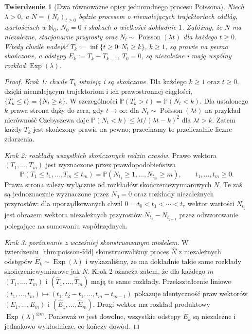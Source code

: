 \documentclass[11pt,a4paper,oneside]{report}
\numberwithin{equation}{chapter}
\theoremstyle{plain}
\newtheorem{twierdzenie}{Twierdzenie}[chapter]
\theoremstyle{definition}
\theoremstyle{remark}
\newcommand{\N}{\mathbb{N}}
\newcommand{\Prob}{\mathbb{P}}
\begin{document}
\begin{twierdzenie}[Dwa równoważne opisy jednorodnego procesu Poissona]
\label{thm:poisson-reverse}
Niech $\lambda>0$, a $N=(N_t)_{t\ge0}$ będzie procesem
o niemalejących trajektoriach c\`adl\`ag, wartościach
w $\N_0$, $N_0=0$ i skokach o wielkości dokładnie $1$.
Załóżmy, że $N$ ma niezależne, stacjonarne przyrosty
oraz $N_t\sim\operatorname{Poisson}(\lambda t)$ dla każdego
$t\ge0$. Wtedy chwile nadejść
$T_k:=\inf\{t\ge0:N_t\ge k\}$, $k\ge1$,
są prawie na pewno skończone, a odstępy
$E_k:=T_k-T_{k-1}$, $T_0=0$, są niezależne i mają
wspólny rozkład $\operatorname{Exp}(\lambda)$.
\end{twierdzenie}
\begin{proof}
\emph{Krok 1: chwile $T_k$ istnieją i są skończone.}
Dla każdego $k\ge1$ oraz $t\ge0$, dzięki niemalejącym
trajektoriom i ich prawostronnej ciągłości,
$\{T_k\le t\}=\{N_t\ge k\}$.
W szczególności $\Prob(T_k>t)=\Prob(N_t<k)$.
Dla ustalonego $k$ prawa strona dąży do zera, gdy
$t\to\infty$: dla $N_t\sim\operatorname{Poisson}(\lambda t)$
na przykład nierówność Czebyszewa daje
$\Prob(N_t<k)\le\lambda t/(\lambda t-k)^2$
dla $\lambda t>k$.
Zatem każdy $T_k$ jest skończony prawie na pewno;
przecinamy te przeliczalnie liczne zdarzenia.

\emph{Krok 2: rozkłady wszystkich skończonych rodzin czasów.}
Prawo wektora $(T_1,\ldots,T_m)$ jest wyznaczone
przez prawdopodobieństwa
\[
\Prob(T_1\le t_1,\ldots,T_m\le t_m)
=\Prob(N_{t_1}\ge1,\ldots,N_{t_m}\ge m),
\qquad t_1,\ldots,t_m\ge0.
\]
Prawa strona zależy wyłącznie od rozkładów
skończeniewymiarowych $N$. Te zaś są jednoznacznie
wyznaczone przez $N_0=0$ oraz rozkłady niezależnych
przyrostów: dla uporządkowanych chwil $0=t_0<t_1<\cdots<t_r$
wektor wartości $N_{t_j}$ jest obrazem wektora
niezależnych przyrostów $N_{t_j}-N_{t_{j-1}}$ przez
odwzorowanie polegające na sumowaniu współrzędnych.

\emph{Krok 3: porównanie z wcześniej skonstruowanym modelem.}
W twierdzeniu~\ref{thm:poisson-fdd} skonstruowaliśmy
proces $\widehat N$ z niezależnych odstępów
$\widehat E_k\sim\operatorname{Exp}(\lambda)$ i wykazaliśmy,
że ma dokładnie takie same rozkłady skończeniewymiarowe jak $N$.
Krok 2 oznacza zatem, że dla każdego $m$
$(T_1,\ldots,T_m)$ i $(\widehat T_1,\ldots,\widehat T_m)$
mają te same rozkłady. Przekształcenie liniowe
$(t_1,\ldots,t_m)\mapsto(t_1,t_2-t_1,\ldots,t_m-t_{m-1})$
pokazuje identyczność praw wektorów
$(E_1,\ldots,E_m)$ i $(\widehat E_1,\ldots,\widehat E_m)$.
Drugi wektor ma rozkład produktowy
$\operatorname{Exp}(\lambda)^{\otimes m}$.
Ponieważ $m$ jest dowolne, wszystkie odstępy $E_k$
są niezależne i jednakowo wykładnicze, co kończy dowód.
\end{proof}
\end{document}
